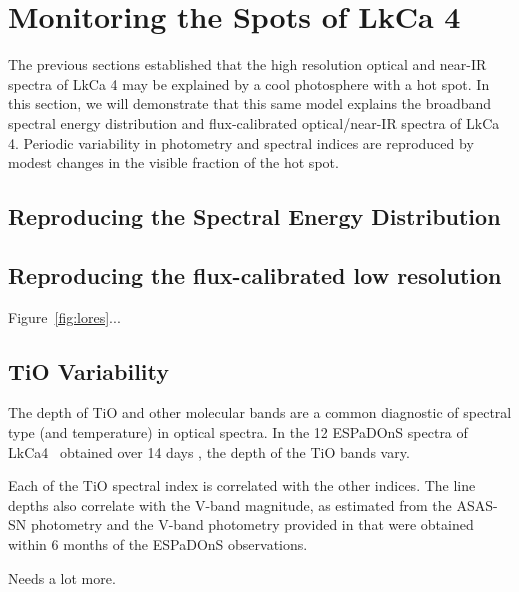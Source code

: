 \documentclass[onecolumn]{emulateapj}%
\newcommand{\name}{LkCa4 }
\begin{document}



\section{Monitoring the Spots of LkCa 4}

The previous sections established that the high resolution optical and near-IR spectra of LkCa 4 may be explained by a cool photosphere with a hot spot.  In this section, we will demonstrate that this same model explains the broadband spectral energy distribution and flux-calibrated optical/near-IR spectra of LkCa 4.  Periodic variability in photometry and spectral indices are reproduced by modest changes in the visible fraction of the hot spot.

\subsection{Reproducing the Spectral Energy Distribution}




\subsection{Reproducing the flux-calibrated low resolution}

Figure~\ref{fig:lores}...




\subsection{TiO Variability}

The depth of TiO and other molecular bands are a common diagnostic of spectral type (and temperature) in optical spectra.  In the 12 ESPaDOnS spectra of \name\ obtained over 14 days \citep{2014MNRAS.444.3220D}, the depth of the TiO bands vary.  


Each of the TiO spectral index is correlated with the other indices.  The line depths also correlate with the V-band magnitude, as estimated from the ASAS-SN photometry and the V-band photometry provided in \citep{2014MNRAS.444.3220D} that were obtained within 6 months of the ESPaDOnS observations.  

Needs a lot more.
\end{document}
